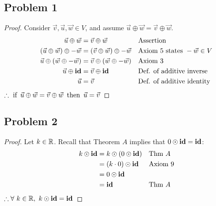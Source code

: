 




\subsection*{Problem 1}
\begin{proof}
  Consider $\vec{v}, \vec{u}, \vec{w} \in V$, and assume $\vec{u} \oplus \vec{w} = \vec{v} \oplus \vec{w}$.
  \begin{align*}
    \vec{u} \oplus \vec{w}                   & = \vec{v} \oplus \vec{w}                   &  & \text{Assertion}                     \\
    (\vec{u} \oplus \vec{w}) \oplus -\vec{w} & = (\vec{v} \oplus \vec{w}) \oplus -\vec{w} &  & \text{Axiom 5 states}~-\vec{w} \in V \\
    \vec{u} \oplus (\vec{w} \oplus -\vec{w}) & = \vec{v} \oplus (\vec{w} \oplus -\vec{w}) &  & \text{Axiom 3}                       \\
    \vec{u} \oplus \operatorname{\textbf{id}}                       & = \vec{v} \oplus \operatorname{\textbf{id}}                       &  & \text{Def. of additive inverse}      \\
    \vec{u}                                  & = \vec{v}                                  &  & \text{Def. of additive identity}
  \end{align*}
  $\therefore \operatorname{~\text{if}~} \vec{u} \oplus \vec{w} = \vec{v} \oplus \vec{w} \operatorname{~\text{then}~} \vec{u} = \vec{v}$
\end{proof}

\subsection*{Problem 2}
\begin{proof}
  Let $k \in \mathbb{R}$. Recall that Theorem $A$ implies that $0 \odot \operatorname{\textbf{id}} = \operatorname{\textbf{id}}$:
  \begin{align*}
    k \odot \operatorname{\textbf{id}} & = k \odot (0 \odot \operatorname{\textbf{id}}) &  & \text{Thm $A$} \\
                & = (k \cdot 0) \odot \operatorname{\textbf{id}} &  & \text{Axiom 9} \\
                & = 0 \odot \operatorname{\textbf{id}}                               \\
                & = \operatorname{\textbf{id}}                    &  & \text{Thm $A$}
  \end{align*}
  $\therefore \forall~k \in \mathbb{R},~k \odot \operatorname{\textbf{id}} = \operatorname{\textbf{id}}$
\end{proof}

